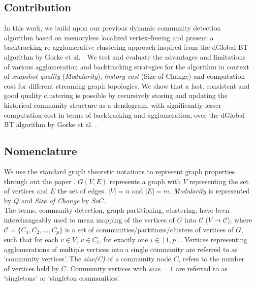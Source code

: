 \documentclass[conference]{IEEEtran}
\begin{document}
\subsection{Contribution}
In this work, we build upon our previous dynamic community detection 
algorithm based on memoryless localized vertex-freeing \cite{rie} and present a 
backtracking re-agglomerative clustering approach inspired from the dGlobal BT
algorithm by Gorke et al. \cite{gor}. We test and evaluate the advantages and 
limitations of various agglomeration and backtracking strategies for the 
algorithm in context of \emph{snapshot quality} (\emph{Modularity}), 
\emph{history cost} (Size of Change) and computation cost \cite{cha} for 
different streaming graph topologies. We show that a fast, consistent 
and good quality clustering is possible by recursively storing and 
updating the historical community structure as a dendogram, with significantly 
lesser computation cost in terms of backtracking and agglomeration, 
over the dGlobal BT algorithm by Gorke et al. \cite{gor}.
\subsection{Nomenclature}
We use the standard graph theoretic notations to represent graph properties 
through out the paper \cite{for}. $G(V, E)$ represents a graph with $V$ 
representing the set of vertices and $E$ the set of edges. $|V| = n$ and $|E| = 
m$. \emph{Modularity} is represented by $Q$ and \emph{Size of Change} by 
$SoC$.\\
The terms, community detection, graph partitioning, clustering, have been 
interchangeably used to mean mapping of the vertices of $G$ into $\mathcal{C}$ 
($V \rightarrow \mathcal{C}$), where $\mathcal{C} = \{C_1, C_2, ..., C_p\}$ is 
a set of communities/partitions/clusters of vertices of $G$, such that for each 
$v \in V$, $v \in C_i$, for exactly one $i \in [1, p]$. Vertices 
representing agglomerations of multiple vertices into a single community are 
referred to as `community vertices'. The \emph{size(C)} of a community node $C$, 
refers to the number of vertices held by $C$. Community vertices with $size = 
1$ are referred to as `singletons' or `singleton communities'. 
\end{document}
